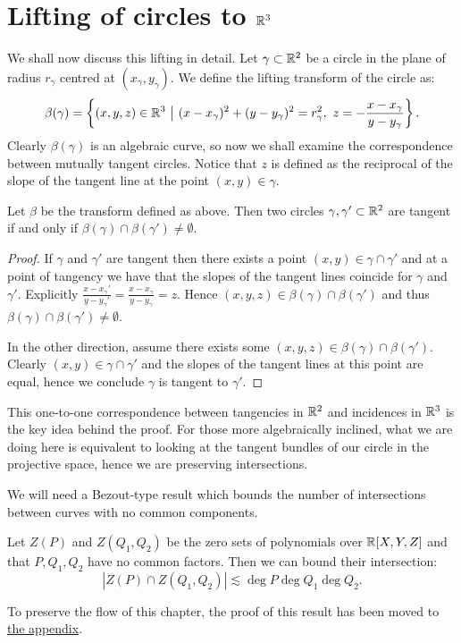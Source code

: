 \section{Lifting of circles to $\mathbb R^3$}

We shall now discuss this lifting in detail. Let $\gamma \subset \mathbb R^2$ be a circle in the plane of radius $r_{\gamma}$ centred at $(x_\gamma, y_\gamma)$. 
We define the lifting transform of the circle as: \[
    \beta(\gamma) = \left \{ (x,y,z) \in \mathbb R^3 \ \big | \ (x-x_\gamma)^2 + (y-y_\gamma)^2 = r_\gamma^2, \ z = - \frac{x-x_\gamma}{y-y_\gamma} \right \}.
\]  
Clearly $\beta(\gamma)$ is an algebraic curve, so now we shall examine the correspondence between mutually tangent circles. Notice that $z$ is defined as the reciprocal of the slope of the tangent line
at the point $(x,y) \in \gamma$.

\begin{lemma}
    Let $\beta$ be the transform defined as above. 
    Then two circles $\gamma, \gamma' \subset \mathbb R^2$ are tangent if and only if $\beta(\gamma) \cap \beta(\gamma') \neq \emptyset$.    \label{lem:beta-lift}
\end{lemma}
\begin{proof}
If $\gamma$ and $\gamma'$ are tangent then there exists a point $(x,y) \in \gamma \cap \gamma'$ and
at a point of tangency we have that the slopes of the tangent lines coincide for $\gamma$ and $\gamma'$. Explicitly $\frac{x-x_\gamma'}{y - y_\gamma'}= \frac{x-x_\gamma}{y - y_\gamma} = z$.
Hence $(x,y,z) \in \beta(\gamma) \cap \beta(\gamma')$ and thus $ \beta(\gamma) \cap \beta(\gamma') \neq \emptyset$.

In the other direction, assume there exists some $(x,y,z) \in \beta(\gamma) \cap \beta(\gamma')$. 
Clearly $(x,y) \in \gamma \cap \gamma'$ and the slopes of the tangent lines at this point are equal,
hence we conclude $\gamma$ is tangent to $\gamma'$.
\end{proof}
This one-to-one correspondence between tangencies in $\mathbb R^2$ and incidences in $\mathbb R^3$ is the key idea behind the proof. 
For those more algebraically inclined, what we are doing here is equivalent to looking at the tangent bundles of our circle in the projective space, hence we 
are preserving intersections.

We will need a Bezout-type result which bounds the number of intersections between curves with no common components.
\begin{lemma}     \label{lem:Bezout}
   Let $Z(P)$ and $Z(Q_1,Q_2)$ be the zero sets of polynomials over $\mathbb R[X,Y,Z]$ and that $P,Q_1,Q_2$ have no common factors.
 Then we can bound their intersection:
    \[ |Z(P) \cap Z(Q_1,Q_2)| \lesssim \deg P \deg Q_1 \deg Q_2.\]
\end{lemma}
To preserve the flow of this chapter, the proof of this result has been moved to \hyperref[appendix:Bezout]{the appendix}.


